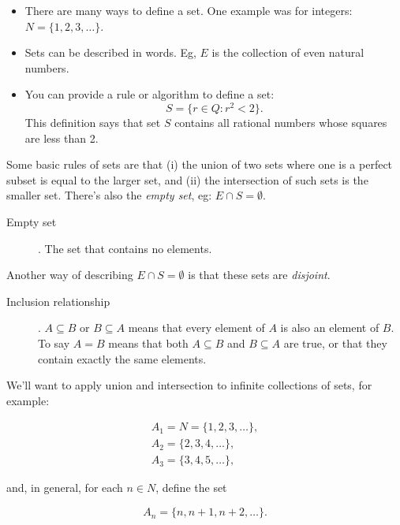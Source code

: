 \documentclass{article}
\numberwithin{equation}{subsection}
\numberwithin{theo}{subsection}
\begin{document}
\begin{itemize}
    \item There are many ways to define a set. One example was for integers: $N
        = \{1,2,3,\ldots\}$.
    \item Sets can be described in words. Eg, $E$ is the collection of even
        natural numbers.
    \item You can provide a rule or algorithm to define a set:
        \begin{equation*}
            S = \{r \in Q: r^2 < 2\}.
        \end{equation*}
        This definition says that set $S$ contains all rational numbers whose
        squares are less than 2.
\end{itemize}

Some basic rules of sets are that (i) the union of two sets where one is a
perfect subset is equal to the larger set, and (ii) the intersection of such sets is
the smaller set. There's also the \emph{empty set}, eg: $E \cap S = \emptyset$.

\begin{description}
    \item[Empty set]. The set that contains no elements.
\end{description}

Another way of describing $E \cap S = \emptyset$ is that these sets are
\emph{disjoint}. 

\begin{description}
    \item[Inclusion relationship]. $A \subseteq B$ or $B \subseteq A$ means that
        every element of $A$ is also an element of $B$. To say $A = B$ means
        that both $A \subseteq B$ and $B \subseteq A$ are true, or that they
        contain exactly the same elements.
\end{description}


We'll want to apply union and intersection to infinite collections of sets, for
example:

\begin{align*}
    A_1 = N = \{1,2,3,\ldots\},\\
    A_2 = \{2,3,4,\ldots\},\\
    A_3 = \{3,4,5,\ldots\},
\end{align*}

and, in general, for each $n \in N$, define the set

\begin{equation*}
    A_n = \{n, n+1, n+2, \ldots\}.
\end{equation*}
\end{document}
